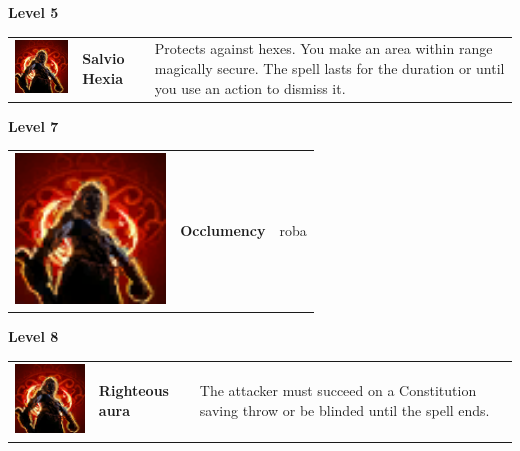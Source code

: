 \textbf{Level 5} 
\begin{tabular}{ m{4cm}m{3cm}m{6cm} } 
	\includegraphics[width=4cm]{../Pictures/Gameplay/Spells/Icon/spell_icon.png} & \textbf{Salvio Hexia} &  Protects against hexes. You make an area within range magically secure. The spell lasts for the duration or until you use an action to dismiss it.\\ 
\end{tabular}
\textbf{Level 7} 
\begin{tabular}{ m{4cm}m{3cm}m{6cm} } 
	\includegraphics[width=4cm]{../Pictures/Gameplay/Spells/Icon/spell_icon.png} & \textbf{Occlumency} & roba \\ %
\end{tabular}
\textbf{Level 8} 
\begin{tabular}{ m{4cm}m{3cm}m{6cm} } 
	\includegraphics[width=4cm]{../Pictures/Gameplay/Spells/Icon/spell_icon.png} & \textbf{Righteous aura} &  The attacker must succeed on a Constitution saving throw or be blinded until the spell ends. \\ %
\end{tabular}

